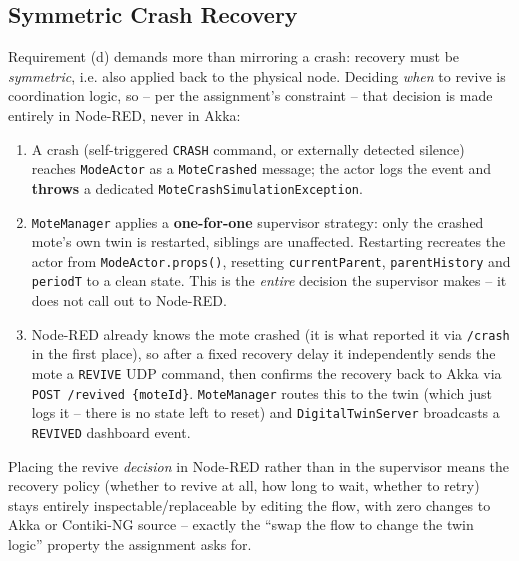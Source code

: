\subsection*{Symmetric Crash Recovery}
Requirement (d) demands more than mirroring a crash: recovery must be \emph{symmetric}, i.e.
also applied back to the physical node. Deciding \emph{when} to revive is coordination logic,
so -- per the assignment's constraint -- that decision is made entirely in Node-RED, never in
Akka:
\begin{sloppypar}
\begin{enumerate}
\item A crash (self-triggered \texttt{CRASH} command, or externally detected silence) reaches
  \texttt{ModeActor} as a \texttt{MoteCrashed} message; the actor logs the event and
  \textbf{throws} a dedicated \texttt{MoteCrashSimulationException}.
\item \texttt{MoteManager} applies a \textbf{one-for-one} supervisor strategy: only
  the crashed mote's own twin is restarted, siblings are unaffected. Restarting recreates the
  actor from \texttt{ModeActor.props()}, resetting \texttt{currentParent},
  \texttt{parentHistory} and \texttt{periodT} to a clean state. This is the \emph{entire} decision
  the supervisor makes -- it does not call out to Node-RED.
\item Node-RED already knows the mote crashed (it is what reported it via \texttt{/crash} in the
  first place), so after a fixed recovery delay it independently sends the mote a
  \texttt{REVIVE} UDP command, then confirms the recovery back to Akka via
  \texttt{POST /revived \{moteId\}}. \texttt{MoteManager} routes this to the twin (which just logs
  it -- there is no state left to reset) and \texttt{DigitalTwinServer} broadcasts a
  \texttt{REVIVED} dashboard event.
\end{enumerate}
\end{sloppypar}
Placing the revive \emph{decision} in Node-RED rather than in the supervisor means the recovery
policy (whether to revive at all, how long to wait, whether to retry) stays entirely
inspectable/replaceable by editing the flow, with zero changes to Akka or Contiki-NG source --
exactly the ``swap the flow to change the twin logic'' property the assignment asks for.
